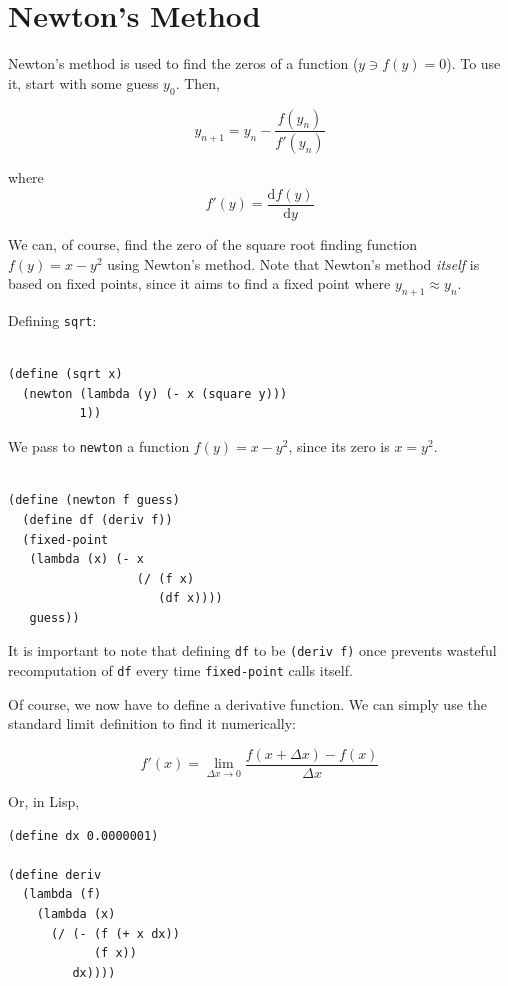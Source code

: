 \documentclass[9pt]{report}
\begin{document}
\section{Newton's Method}
\label{sec:org3b45013}

Newton's method is used to find the zeros of a function (\(y \ni
   f(y)=0\)). To use it, start with some guess \(y_0\). Then,

$$y_{n+1} = y_n - \frac{f(y_n)}{f'(y_n)}$$

where $$f'(y) = \frac{\mathrm{d}f(y)}{\mathrm{d}y}$$

We can, of course, find the zero of the square root finding function
\(f(y) =  x-y^2\) using Newton's method. Note that Newton's method
\emph{itself} is based on fixed points, since it aims to find a fixed
point where \(y_{n+1}\approx y_n\).

Defining \texttt{sqrt}:

\begin{verbatim}

(define (sqrt x)
  (newton (lambda (y) (- x (square y)))
          1))
\end{verbatim}

We pass to \texttt{newton} a function \(f(y)=x-y^2\), since its zero is \(x=y^2\).

\begin{verbatim}

(define (newton f guess)
  (define df (deriv f))
  (fixed-point
   (lambda (x) (- x
                  (/ (f x)
                     (df x))))
   guess))
\end{verbatim}


It is important to note that defining \texttt{df} to be \texttt{(deriv f)} once
prevents wasteful recomputation of \texttt{df} every time \texttt{fixed-point}
calls itself.

Of course, we now have to define a derivative function. We can
simply use the standard limit definition to find it numerically:

$$f'(x) = \lim_{\Delta x\to 0} \frac{f(x+\Delta x) - f(x)}{\Delta
   x}$$

Or, in Lisp,

\begin{verbatim}
(define dx 0.0000001)

(define deriv
  (lambda (f)
    (lambda (x)
      (/ (- (f (+ x dx))
            (f x))
         dx))))


\end{verbatim}
\end{document}

